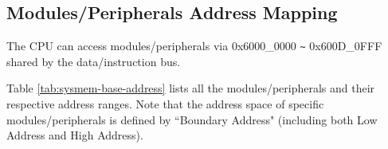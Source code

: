 \documentclass[main\_\_EN.tex]{subfiles}
\begin{document}
\subsection{Modules/Peripherals Address Mapping}

The CPU can access modules/peripherals via 0x{}6000\_0000 \verb+~+ 0x{}600D\_0FFF shared by the data/instruction bus.

Table \ref{tab:sysmem-base-address} lists all the modules/peripherals and their respective address ranges. Note that the address space of specific modules/peripherals is defined by ``Boundary Address" (including both Low Address and High Address).



\end{document}
